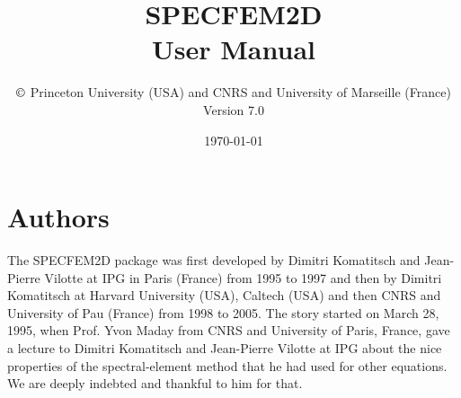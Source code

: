 \documentclass[oneside,english,onecolumn,letterpaper]{book}
\begin{document}
\begin{center}
\thispagestyle{empty}%
\vspace*{-1.8truecm}
\noindent{}
\end{center}
%
\title{\textbf{SPECFEM2D}\\
\textbf{User Manual}}

\author{$\copyright$ Princeton University (USA) and CNRS and University of Marseille (France)\\
Version 7.0
}

\date{\noindent \today}

\maketitle

\section*{Authors}
The SPECFEM2D package was first developed by Dimitri Komatitsch and Jean-Pierre Vilotte at IPG in Paris (France) from 1995 to 1997
and then by Dimitri Komatitsch at Harvard University (USA), Caltech (USA) and then CNRS and University of Pau (France) from 1998 to 2005.
The story started on March 28, 1995, when Prof. Yvon Maday from CNRS and University of Paris, France, gave a lecture to
Dimitri Komatitsch and Jean-Pierre Vilotte at IPG about the nice properties of the spectral-element method that he had used for
other equations. We are deeply indebted and thankful to him for that.\\
\end{document}

